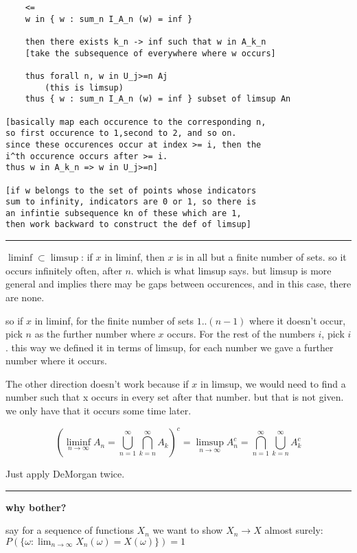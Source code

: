 \documentclass{article}
\begin{document}
\begin{flushleft}
\begin{verbatim}
    <=
    w in { w : sum_n I_A_n (w) = inf }

    then there exists k_n -> inf such that w in A_k_n
    [take the subsequence of everywhere where w occurs]

    thus forall n, w in U_j>=n Aj
        (this is limsup)
    thus { w : sum_n I_A_n (w) = inf } subset of limsup An
    
[basically map each occurence to the corresponding n, 
so first occurence to 1,second to 2, and so on. 
since these occurences occur at index >= i, then the
i^th occurence occurs after >= i. 
thus w in A_k_n => w in U_j>=n]

[if w belongs to the set of points whose indicators
sum to infinity, indicators are 0 or 1, so there is 
an infintie subsequence kn of these which are 1, 
then work backward to construct the def of limsup]

\end{verbatim}

\bigbreak
\hrule
\bigbreak
\textbf{$\liminf \subset \limsup$}: if $x$ in liminf, then $x$ is in all but a finite number of sets. so it occurs infinitely often, after $n$. which is what limsup says. but limsup is more general and implies there may be gaps between occurences, and in this case, there are none.

\bigbreak

so if $x$ in liminf, for the finite number of sets $1..(n-1)$ where it doesn't occur, pick $n$ as the further number where $x$ occurs. For the rest of the numbers $i$, pick $i$. this way we defined it in terms of limsup, for each number we gave a further number where it occurs. 

\bigbreak

The other direction doesn't work because if $x$ in limsup, we would need to find a number such that x occurs in every set after that number. but that is not given. we only have that it occurs some time later.

\[ 
    (\liminf_{n \rightarrow \infty} A_n = \bigcup_{n=1}^{\infty} \bigcap_{k=n}^{\infty} A_k)^c = \limsup_{n \rightarrow \infty} A_n^c = \bigcap_{n=1}^{\infty} \bigcup_{k=n}^{\infty} A_k^c
\]

Just apply DeMorgan twice.

\bigbreak
\hrule
\bigbreak
\textbf{why bother?}

\bigbreak

say for a sequence of functions $X_n$ we want to show $X_n \rightarrow X$ almost surely: $P( \{ \omega : \lim_{n \rightarrow \infty} X_n(\omega) = X(\omega) \} ) = 1$


\end{flushleft}
\end{document}
